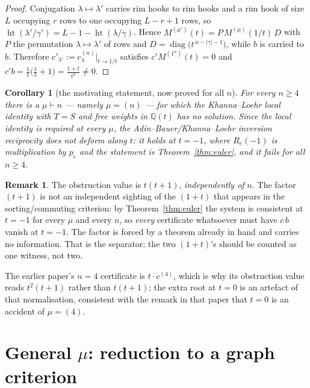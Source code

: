 \documentclass[11pt]{article}
\newtheorem{corollary}[theorem]{Corollary}
\theoremstyle{definition}
\newtheorem{remark}[theorem]{Remark}
\newcommand{\Q}{\mathbb{Q}}
\newcommand{\hgt}{\operatorname{ht}}      %
\begin{document}
\begin{proof}
Conjugation $\lambda\mapsto\lambda'$ carries rim hooks to rim hooks and a rim hook of size
$L$ occupying $r$ rows to one occupying $L-r+1$ rows, so
$\hgt(\lambda'/\gamma')=L-1-\hgt(\lambda/\gamma)$. Hence
$M^{(\mu')}(t)=P\,M^{(\mu)}(1/t)\,D$ with $P$ the permutation $\lambda\mapsto\lambda'$ of
rows and $D=\operatorname{diag}\bigl(t^{\,n-|\gamma|-1}\bigr)$, while $b$ is carried to $b$.
Therefore $c'_{\lambda'}:=c^{(n)}_\lambda\big|_{t\to1/t}$ satisfies $c'M^{(1^n)}(t)=0$ and
$c'b=\frac1t\bigl(\frac1t+1\bigr)=\frac{1+t}{t^2}\ne0$.
\end{proof}

\begin{corollary}[the motivating statement, now proved for all $n$]\label{cor:answer}
For every $n\ge4$ there is a $\mu\vdash n$ --- namely $\mu=(n)$ --- for which the
Khanna--Loehr local identity with $T=S$ and free weights in $\Q(t)$ has no solution. Since
the local identity is required at every $\mu$, the Adin--Bauer/Khanna--Loehr inversion
reciprocity does not deform along $t$: it holds at $t=-1$, where $R_e(-1)$ is multiplication
by $p_e$ and the statement is Theorem~\ref{thm:euler}, and it fails for all $n\ge4$.
\end{corollary}

\begin{remark}\label{rem:sep}
The obstruction value is $t(t+1)$, \emph{independently of $n$}. The factor $(t+1)$ is not an
independent sighting of the $(1+t)$ that appears in the sorting/commuting criterion: by
Theorem~\ref{thm:euler} the system is consistent at $t=-1$ for every $\mu$ and every $n$, so
\emph{every} certificate whatsoever must have $c\,b$ vanish at $t=-1$. The factor is forced
by a theorem already in hand and carries no information. That is the separator; the two
$(1+t)$'s should be counted as one witness, not two.

The earlier paper's $n=4$ certificate is $t\cdot c^{(4)}$, which is why its obstruction value
reads $t^2(t+1)$ rather than $t(t+1)$; the extra root at $t=0$ is an artefact of that
normalisation, consistent with the remark in that paper that $t=0$ is an accident of
$\mu=(4)$.
\end{remark}

\section{General $\mu$: reduction to a graph criterion}\label{sec:graph}
\end{document}
